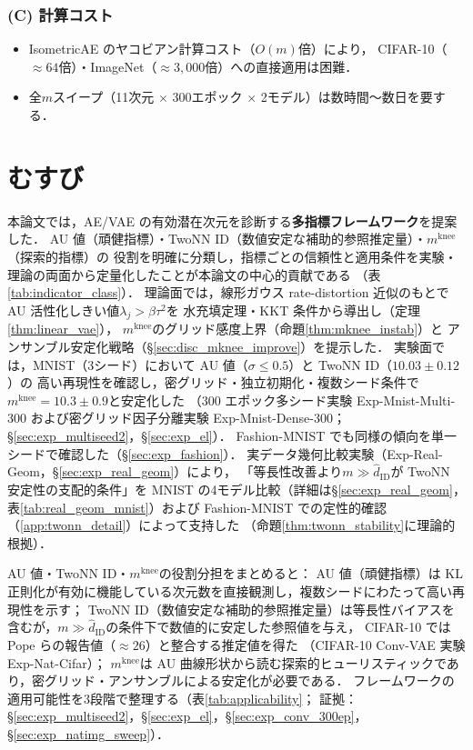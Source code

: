 \documentclass[11pt,a4paper]{jsarticle}
\newcommand{\mknee}{m^{\mathrm{knee}}}
\begin{document}
\subsubsection*{(C) 計算コスト}

\begin{itemize}
  \item IsometricAE のヤコビアン計算コスト（$O(m)$倍）により，
        CIFAR-10（$\approx 64$倍）・ImageNet（$\approx 3{,}000$倍）への直接適用は困難．
  \item 全$m$スイープ（11次元 $\times$ 300エポック $\times$ 2モデル）は数時間〜数日を要する．
\end{itemize}

\section{むすび}\label{sec:conclusion}

本論文では，AE/VAE の有効潜在次元を診断する\textbf{多指標フレームワーク}を提案した．
AU 値（頑健指標）・TwoNN ID（数値安定な補助的参照推定量）・$\mknee$（探索的指標）の
役割を明確に分類し，指標ごとの信頼性と適用条件を実験・理論の両面から定量化したことが本論文の中心的貢献である
（表\ref{tab:indicator_class}）．
理論面では，線形ガウス rate-distortion 近似のもとで AU 活性化しきい値$\lambda_j > \beta\tau^2$を
水充填定理・KKT 条件から導出し（定理\ref{thm:linear_vae}），
$\mknee$のグリッド感度上界（命題\ref{thm:mknee_instab}）と
アンサンブル安定化戦略（§\ref{sec:disc_mknee_improve}）を提示した．
実験面では，MNIST（3シード）において AU 値（$\sigma \leq 0.5$）と TwoNN ID（$10.03 \pm 0.12$）の
高い再現性を確認し，密グリッド・独立初期化・複数シード条件で$\mknee = 10.3 \pm 0.9$と安定化した
（300 エポック多シード実験 Exp-Mnist-Multi-300 および密グリッド因子分離実験 Exp-Mnist-Dense-300；
§\ref{sec:exp_multiseed2}，§\ref{sec:exp_el}）．
Fashion-MNIST でも同様の傾向を単一シードで確認した（§\ref{sec:exp_fashion}）．
実データ幾何比較実験（Exp-Real-Geom，§\ref{sec:exp_real_geom}）により，
「等長性改善より$m \gg \hat{d}_\mathrm{ID}$が TwoNN 安定性の支配的条件」を
MNIST の4モデル比較（詳細は§\ref{sec:exp_real_geom}，表\ref{tab:real_geom_mnist}）および
Fashion-MNIST での定性的確認（\ref{app:twonn_detail}）によって支持した
（命題\ref{thm:twonn_stability}に理論的根拠）．

AU 値・TwoNN ID・$\mknee$の役割分担をまとめると：
AU 値（頑健指標）は KL 正則化が有効に機能している次元数を直接観測し，複数シードにわたって高い再現性を示す；
TwoNN ID（数値安定な補助的参照推定量）は等長性バイアスを含むが，$m \gg \hat{d}_\mathrm{ID}$の条件下で数値的に安定した参照値を与え，
CIFAR-10 では Pope ら\cite{pope2021intrinsic}の報告値（$\approx 26$）と整合する推定値を得た
（CIFAR-10 Conv-VAE 実験 Exp-Nat-Cifar）；
$\mknee$は AU 曲線形状から読む探索的ヒューリスティックであり，密グリッド・アンサンブルによる安定化が必要である．
フレームワークの適用可能性を3段階で整理する（表\ref{tab:applicability}；
証拠：§\ref{sec:exp_multiseed2}，§\ref{sec:exp_el}，§\ref{sec:exp_conv_300ep}，§\ref{sec:exp_natimg_sweep}）．
\end{document}
